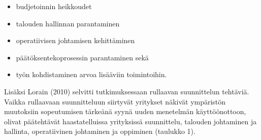 \documentclass[12pt,a4paper,oneside,pdftex]{report}
\begin{document}
\begin{itemize}
\setlength{\itemsep}{0pt}
\item budjetoinnin heikkoudet
\item talouden hallinnan parantaminen
\item operatiivisen johtamisen kehittäminen
\item päätöksentekoprosessin parantaminen sekä
\item työn kohdistaminen arvoa lisääviin toimintoihin.
\end{itemize}

Lisäksi Lorain (2010) selvitti tutkimuksessaan rullaavan suunnittelun tehtäviä. Vaikka rullaavaan suunnitteluun siirtyvät yritykset näkivät ympäristön muutoksiin sopeutumisen tärkeänä syynä uuden menetelmän käyttöönottoon, olivat päätehtävät haastatelluissa yrityksissä suunnittelu, talouden johtaminen ja hallinta, operatiivinen johtaminen ja oppiminen (taulukko 1).
\end{document}
